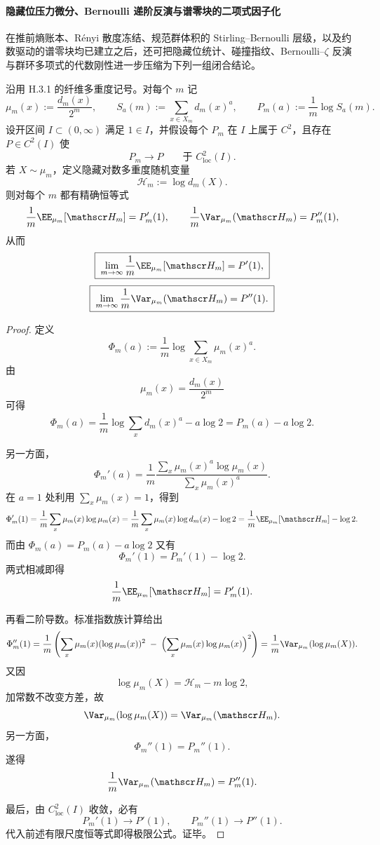 \paragraph{隐藏位压力微分、Bernoulli 递阶反演与谱零块的二项式因子化}
在推前熵账本、Rényi 散度冻结、规范群体积的 Stirling--Bernoulli 层级，以及约数驱动的谱零块均已建立之后，还可把隐藏位统计、碰撞指纹、Bernoulli--\(\zeta\) 反演与群环多项式的代数刚性进一步压缩为下列一组闭合结论。

\begin{theorem}[压力谱在 \texorpdfstring{$a=1$}{a=1} 的一、二阶导数分别给出隐藏对数多重度的密度与涨落]\label{thm:xi-time-part60ab-hidden-logmultiplicity-pressure-derivatives}
沿用 H.3.1 的纤维多重度记号。对每个 \(m\) 记
\[
\mu_m(x):=\frac{d_m(x)}{2^m},
\qquad
S_a(m):=\sum_{x\in X_m} d_m(x)^a,
\qquad
P_m(a):=\frac1m\log S_a(m).
\]
设开区间 \(I\subset (0,\infty)\) 满足 \(1\in I\)，并假设每个 \(P_m\) 在 \(I\) 上属于 \(C^2\)，且存在 \(P\in C^2(I)\) 使
\[
P_m\longrightarrow P
\qquad\text{于 }C^2_{\mathrm{loc}}(I).
\]
若 \(X\sim \mu_m\)，定义隐藏对数多重度随机变量
\[
\mathscr H_m:=\log d_m(X).
\]
则对每个 \(m\) 都有精确恒等式
\[
\frac1m\EE_{\mu_m}[\mathscr H_m]=P_m'(1),
\qquad
\frac1m\Var_{\mu_m}(\mathscr H_m)=P_m''(1),
\]
从而
\[
\boxed{\;
\lim_{m\to\infty}\frac1m\EE_{\mu_m}[\mathscr H_m]=P'(1),\;}
\]
\[
\boxed{\;
\lim_{m\to\infty}\frac1m\Var_{\mu_m}(\mathscr H_m)=P''(1).\;}
\]
\end{theorem}
\begin{proof}
定义
\[
\Phi_m(a):=\frac1m\log\sum_{x\in X_m}\mu_m(x)^a.
\]
由
\[
\mu_m(x)=\frac{d_m(x)}{2^m}
\]
可得
\[
\Phi_m(a)
=
\frac1m\log\sum_x d_m(x)^a-a\log 2
=
P_m(a)-a\log 2.
\]

另一方面，
\[
\Phi_m'(a)
=
\frac1m
\frac{\sum_x \mu_m(x)^a\log \mu_m(x)}{\sum_x\mu_m(x)^a}.
\]
在 \(a=1\) 处利用 \(\sum_x\mu_m(x)=1\)，得到
\[
\Phi_m'(1)
=
\frac1m\sum_x\mu_m(x)\log\mu_m(x)
=
\frac1m\sum_x\mu_m(x)\log d_m(x)-\log 2
=
\frac1m\EE_{\mu_m}[\mathscr H_m]-\log 2.
\]
而由 \(\Phi_m(a)=P_m(a)-a\log 2\) 又有
\[
\Phi_m'(1)=P_m'(1)-\log 2.
\]
两式相减即得
\[
\frac1m\EE_{\mu_m}[\mathscr H_m]=P_m'(1).
\]

再看二阶导数。标准指数族计算给出
\[
\Phi_m''(1)
=
\frac1m
\left(
\sum_x\mu_m(x)(\log\mu_m(x))^2
\;-\;
\Bigl(\sum_x\mu_m(x)\log\mu_m(x)\Bigr)^2
\right)
=
\frac1m\Var_{\mu_m}(\log\mu_m(X)).
\]
又因
\[
\log\mu_m(X)=\mathscr H_m-m\log 2,
\]
加常数不改变方差，故
\[
\Var_{\mu_m}(\log\mu_m(X))=\Var_{\mu_m}(\mathscr H_m).
\]
另一方面，
\[
\Phi_m''(1)=P_m''(1).
\]
遂得
\[
\frac1m\Var_{\mu_m}(\mathscr H_m)=P_m''(1).
\]

最后，由 \(C^2_{\mathrm{loc}}(I)\) 收敛，必有
\[
P_m'(1)\to P'(1),
\qquad
P_m''(1)\to P''(1).
\]
代入前述有限尺度恒等式即得极限公式。证毕。
\end{proof}

